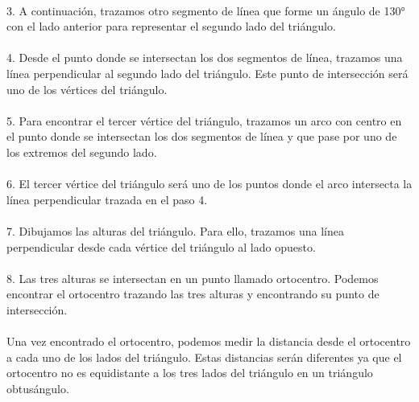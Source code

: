 \documentclass{article}
\begin{document}
\\
3. A continuación, trazamos otro segmento de línea que forme un ángulo de 130° con el lado anterior para representar el segundo lado del triángulo.\\
\\
4. Desde el punto donde se intersectan los dos segmentos de línea, trazamos una línea perpendicular al segundo lado del triángulo. Este punto de intersección será uno de los vértices del triángulo.\\
\\
5. Para encontrar el tercer vértice del triángulo, trazamos un arco con centro en el punto donde se intersectan los dos segmentos de línea y que pase por uno de los extremos del segundo lado.\\
\\
6. El tercer vértice del triángulo será uno de los puntos donde el arco intersecta la línea perpendicular trazada en el paso 4.\\
\\
7. Dibujamos las alturas del triángulo. Para ello, trazamos una línea perpendicular desde cada vértice del triángulo al lado opuesto.\\
\\
8. Las tres alturas se intersectan en un punto llamado ortocentro. Podemos encontrar el ortocentro trazando las tres alturas y encontrando su punto de intersección.\\
\\
Una vez encontrado el ortocentro, podemos medir la distancia desde el ortocentro a cada uno de los lados del triángulo. Estas distancias serán diferentes ya que el ortocentro no es equidistante a los tres lados del triángulo en un triángulo obtusángulo.\\
\\
\end{document}
